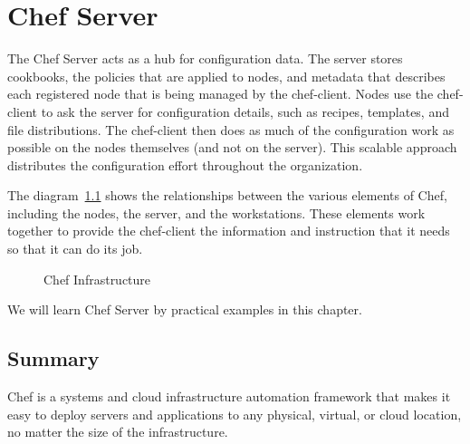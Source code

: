 \chapter{Chef Server}

The Chef Server acts as a hub for configuration data. The server stores cookbooks, the policies that are applied to nodes, and metadata that describes each registered node that is being managed by the chef-client. Nodes use the chef-client to ask the server for configuration details, such as recipes, templates, and file distributions. The chef-client then does as much of the configuration work as possible on the nodes themselves (and not on the server). This scalable approach distributes the configuration effort throughout the organization.

The diagram~\ref{fig:overview_chef_draft} shows the relationships between the various elements of Chef, including the nodes, the server, and the workstations. These elements work together to provide the chef-client the information and instruction that it needs so that it can do its job.

\begin{figure}[ht!]
  \caption{Chef Infrastructure}
  \label{fig:overview_chef_draft}
\end{figure}

We will learn Chef Server by practical examples in this chapter.









\section{Summary}

Chef is a systems and cloud infrastructure automation framework that makes it easy to deploy servers and applications to any physical, virtual, or cloud location, no matter the size of the infrastructure.